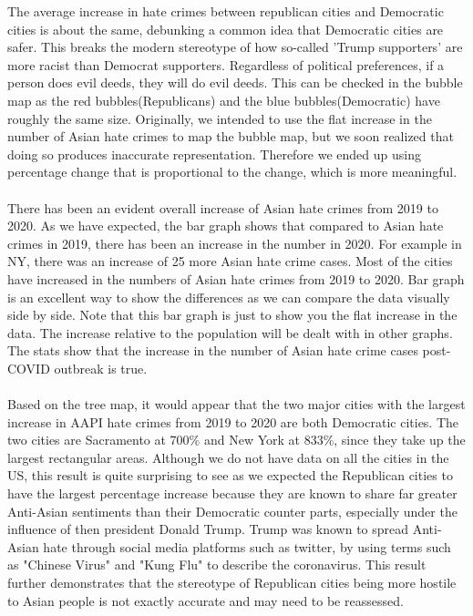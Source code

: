 \documentclass[fontsize=11pt]{article}
\begin{document}
\quad The average increase in hate crimes between republican cities and Democratic cities is about the same, debunking a common idea that Democratic cities are safer. This breaks the modern stereotype of how so-called 'Trump supporters' are more racist than Democrat supporters. Regardless of political preferences, if a person does evil deeds, they will do evil deeds. This can be checked in the bubble map as the red bubbles(Republicans) and the blue bubbles(Democratic) have roughly the same size. Originally, we intended to use the flat increase in the number of Asian hate crimes to map the bubble map, but we soon realized that doing so produces inaccurate representation. Therefore we ended up using percentage change that is proportional to the change, which is more meaningful.
\\\\
\quad There has been an evident overall increase of Asian hate crimes from 2019 to 2020. As we have expected, the bar graph shows that compared to Asian hate crimes in 2019, there has been an increase in the number in 2020. For example in NY, there was an increase of 25 more Asian hate crime cases. Most of the cities have increased in the numbers of Asian hate crimes from 2019 to 2020. Bar graph is an excellent way to show the differences as we can compare the data visually side by side. Note that this bar graph is just to show you the flat increase in the data. The increase relative to the population will be dealt with in other graphs. The stats show that the increase in the number of Asian hate crime cases post-COVID outbreak is true.
\\\\
\quad
Based on the tree map, it would appear that the two major cities with the largest increase in AAPI hate crimes from 2019 to 2020 are both Democratic cities. The two cities are Sacramento at 700\% and New York at 833\%, since they take up the largest rectangular areas. Although we do not have data on all the cities in the US, this result is quite surprising to see  as we expected the Republican cities to have the largest percentage increase because they are known to share far greater Anti-Asian sentiments than their Democratic counter parts, especially under the influence of then president Donald Trump. Trump was known to spread Anti-Asian hate through social media platforms such as twitter, by using terms such as "Chinese Virus" and "Kung Flu" to describe the coronavirus. This result further demonstrates that the stereotype of Republican cities being more hostile to Asian people is not exactly accurate and may need to be reassessed.
\end{document}

